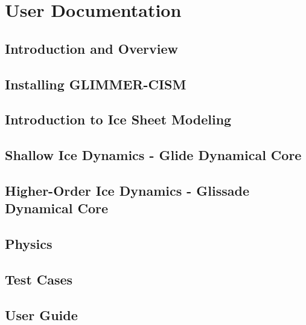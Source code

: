 \mainmatter
\part{User Documentation}

\chapter{Introduction and Overview}
\newcommand{\dir}{intro}


\chapter{Installing GLIMMER-CISM}
\renewcommand{\dir}{install}


\chapter{Introduction to Ice Sheet Modeling}
\renewcommand{\dir}{modeling-intro}


\chapter{Shallow Ice Dynamics - Glide Dynamical Core}
\renewcommand{\dir}{shallow-ice}


\chapter{Higher-Order Ice Dynamics - Glissade Dynamical Core}
\renewcommand{\dir}{higher-order}


\chapter{Physics}
\renewcommand{\dir}{physics}


\chapter{Test Cases}
\renewcommand{\dir}{tests}



\chapter{User Guide}
\renewcommand{\dir}{ug}


